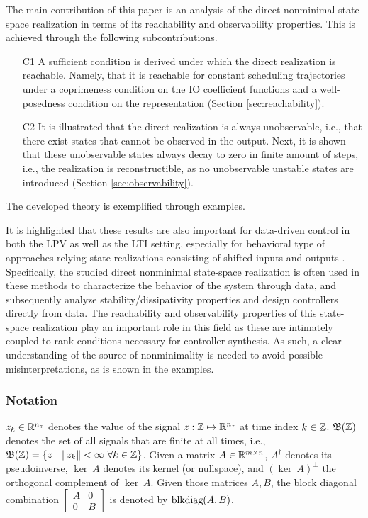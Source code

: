 The main contribution of this paper is an analysis of the direct nonminimal state-space realization in terms of its reachability and observability properties. This is achieved through the following subcontributions.
\begin{itemize}[topsep=0pt,noitemsep]
    \item[C1] A sufficient condition is derived under which the direct realization is reachable. Namely, that it is reachable for constant scheduling trajectories under a coprimeness condition on the IO coefficient functions and a well-posedness condition on the representation (Section \ref{sec:reachability}).
    \item[C2] It is illustrated that the direct realization is always unobservable, i.e., that there exist states that cannot be observed in the output. Next, it is shown that these unobservable states always decay to zero in finite amount of steps, i.e., the realization is reconstructible, as no unobservable unstable states are introduced (Section \ref{sec:observability}).
\end{itemize}
The developed theory is exemplified through examples. 

It is highlighted that these results are also important for data-driven control in both the LPV as well as the LTI setting, especially for behavioral type of approaches relying state realizations consisting of shifted inputs and outputs \cite{Coulson2019, Dai2023, DePersis2020, Park2009, VanWaarde2022, Verlioek2021}. Specifically, the studied direct nonminimal state-space realization is often used in these methods to characterize the behavior of the system through data, and subsequently analyze stability/dissipativity properties and design controllers directly from data. The reachability and observability properties of this state-space realization play an important role in this field as these are intimately coupled to rank conditions necessary for controller synthesis. As such, a clear understanding of the source of nonminimality is needed to avoid possible misinterpretations, as is shown in the examples.

\subsubsection*{Notation} $z_k \in \mathbb{R}^{n_z}$ denotes the value of the signal $z: \mathbb{Z} \mapsto \mathbb{R}^{n_z}$ at time index $k\in\mathbb{Z}$. $\mathfrak{B}(\mathbb{Z})$ denotes the set of all signals that are finite at all times, i.e., $\signalspaceDT = \{z \ | \ \norm{z_k} < \infty \ \forall  k \in\Zee \}$. Given a matrix $A\in\mathbb{R}^{m\times n}$, $A^\dag$ denotes its pseudoinverse, $\ker\ A$ denotes its kernel (or nullspace), and $(\ker\ A)^\perp$ the orthogonal complement of $\ker\ A$. Given those matrices $A,B$, the block diagonal combination $\begin{bmatrix} A & 0 \\ 0 & B
\end{bmatrix}$ is denoted by $\text{blkdiag}(A,B)$.

